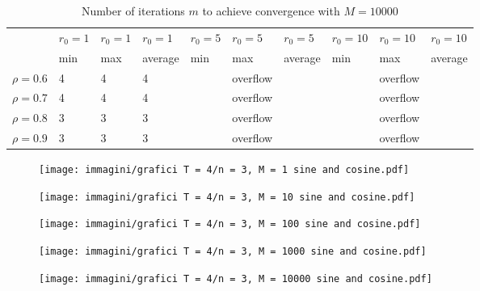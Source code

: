 \documentclass[a4paper,11pt,openright]{report}
\begin{document}
\begin{table}[H]
\centering
\addtolength{\leftskip}{-1.5cm}
\addtolength{\rightskip}{-1.5cm}
\begin{tabular}{|c|lllllllll|}
\hline
$ $ & $r_0 = 1$ & $r_0 = 1$ & $r_0 = 1$ & $r_0 = 5$ & $r_0 = 5$ & $r_0 = 5$ & $r_0 = 10$ & $r_0 = 10$ & $r_0 = 10$  \\
$ $ & min & max & average & min & max & average & min & max & average \\ 
\hline
$\rho = 0.6$ & 4 & 4 & 4 &  & overflow &  &  & overflow &  \\

$\rho = 0.7$ & 4 & 4 & 4 &  & overflow &  &  & overflow &  \\

$\rho = 0.8$ & 3 & 3 & 3 &  & overflow &  &  & overflow & \\

$\rho = 0.9$ & 3 & 3 & 3 &  & overflow &  &  & overflow & \\
\hline
\end{tabular}
\caption{Number of iterations $m$ to achieve convergence with $M = 10000$}
\end{table}
\begin{figure}[H]
\centering
\texttt{[image: immagini/grafici T = 4/n = 3, M = 1 sine and cosine.pdf]}
\end{figure}
\begin{figure}[H]
\centering
\texttt{[image: immagini/grafici T = 4/n = 3, M = 10 sine and cosine.pdf]}
\end{figure}
\begin{figure}[H]
\centering
\texttt{[image: immagini/grafici T = 4/n = 3, M = 100 sine and cosine.pdf]}
\end{figure}
\begin{figure}[H]
\centering
\texttt{[image: immagini/grafici T = 4/n = 3, M = 1000 sine and cosine.pdf]}
\end{figure}
\begin{figure}[H]
\centering
\texttt{[image: immagini/grafici T = 4/n = 3, M = 10000 sine and cosine.pdf]}
\end{figure}
\newpage
\end{document}
